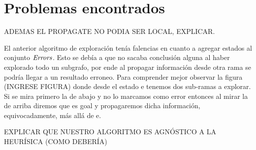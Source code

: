 \section{Problemas encontrados}

ADEMAS EL PROPAGATE NO PODIA SER LOCAL, EXPLICAR.

El anterior algoritmo de exploración tenía falencias en cuanto a agregar estados al conjunto $\mathit{Errors}$. Esto se debía a que no sacaba conclusión alguna al haber explorado todo un subgrafo, por ende al propagar información desde otra rama se podría llegar a un resultado erroneo. Para comprender mejor observar la figura (INGRESE FIGURA) donde desde el estado e tenemos dos sub-ramas a explorar. Si se mira primero la de abajo y no lo marcamos como error entonces al mirar la de arriba diremos que es goal y propagaremos dicha información, equivocadamente, más allá de e.

EXPLICAR QUE NUESTRO ALGORITMO ES AGNÓSTICO A LA HEURÍSICA (COMO DEBERÍA)


